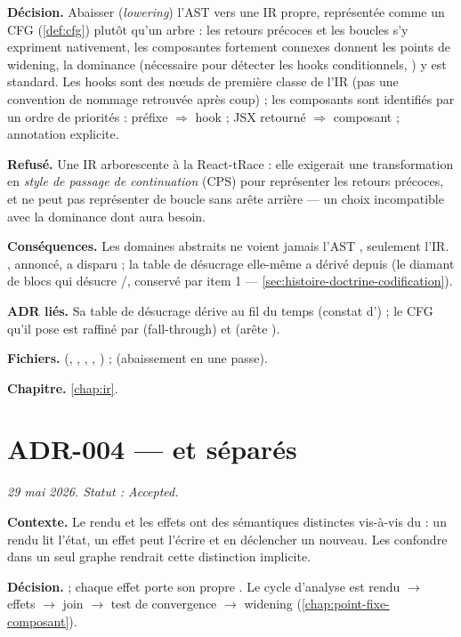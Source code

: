 \textbf{Décision.} Abaisser (\emph{lowering}) l'AST vers une IR propre,
représentée comme un CFG (\cref{def:cfg}) plutôt qu'un arbre : les retours
précoces et les boucles s'y expriment nativement, les composantes fortement
connexes donnent les points de widening, la dominance (nécessaire pour
détecter les hooks conditionnels, ) y est standard.
Les hooks sont des nœuds de première classe de l'IR (pas une convention de
nommage retrouvée après coup) ; les composants sont identifiés par un ordre de
priorités : préfixe  $\Rightarrow$ hook ; JSX retourné $\Rightarrow$
composant ; annotation explicite.

\textbf{Refusé.} Une IR arborescente à la React-tRace : elle exigerait une
transformation en \emph{style de passage de continuation} (CPS) pour
représenter les retours précoces, et ne peut pas représenter de boucle sans
arête arrière — un choix incompatible avec la dominance dont  aura
besoin.

\textbf{Conséquences.} Les domaines abstraits ne voient jamais l'AST ,
seulement l'IR. , annoncé, a disparu ; la table de désucrage
elle-même a dérivé depuis (le diamant de blocs qui désucre \code{\&\&}/\code{||},
conservé par  item 1 --- \cref{sec:histoire-doctrine-codification}).

\textbf{ADR liés.} Sa table de désucrage dérive au fil du temps (constat
d') ; le CFG qu'il pose est raffiné par  (fall-through) et
 (arête ).

\textbf{Fichiers.}  (, , ,
, ) ;  (abaissement en une
passe).

\textbf{Chapitre.} \cref{chap:ir}.

\section{ADR-004 ---  et  séparés}
\label{adr:4}
\noindent\textit{29 mai 2026. Statut : Accepted.}

\textbf{Contexte.} Le rendu et les effets ont des sémantiques distinctes
vis-à-vis du  : un rendu lit l'état, un effet peut l'écrire et
en déclencher un nouveau. Les confondre dans un seul graphe rendrait cette
distinction implicite.

\textbf{Décision.}  ;
chaque effet porte son propre . Le cycle d'analyse est
rendu $\to$ effets $\to$ join $\to$ test de convergence $\to$ widening
(\cref{chap:point-fixe-composant}).

